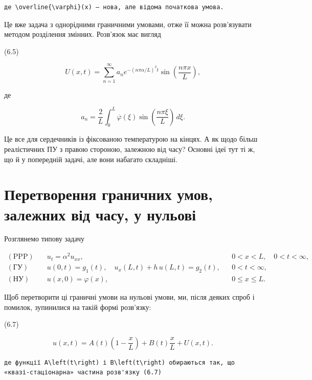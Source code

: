 \documentclass[
  ukrainian,
]{article}
\begin{document}
\begin{verbatim}
де \overline{\varphi}(x) — нова, але відома початкова умова.
\end{verbatim}

Це вже задача з однорідними граничними умовами, отже її можна
розв'язувати методом розділення змінних. Розв'язок має вигляд

(6.5)

\[
U(x,t)=\sum_{n=1}^{\infty} a_n e^{-(n\pi\alpha/L)^2 t}\sin\!\left(\frac{n\pi x}{L}\right),
\]

де

\[
a_n=\frac{2}{L}\int_0^L \overline{\varphi}(\xi)\sin\!\left(\frac{n\pi \xi}{L}\right)\,d\xi.
\]

Це все для сердечників із фіксованою температурою на кінцях. А як щодо
більш реалістичних ПУ з правою стороною, залежною від часу? Основні ідеї
тут ті ж, що й у попередній задачі, але вони набагато складніші.

\section{Перетворення граничних умов, залежних від часу, у
нульові}\label{ux43fux435ux440ux435ux442ux432ux43eux440ux435ux43dux43dux44f-ux433ux440ux430ux43dux438ux447ux43dux438ux445-ux443ux43cux43eux432-ux437ux430ux43bux435ux436ux43dux438ux445-ux432ux456ux434-ux447ux430ux441ux443-ux443-ux43dux443ux43bux44cux43eux432ux456}

Розглянемо типову задачу

\[
\begin{aligned}
(\text{PPP})\quad & u_t = \alpha^2 u_{xx}, && 0 < x < L,\quad 0 < t < \infty, \\
(\text{ГУ})\quad & u(0,t)=g_1(t),\quad u_x(L,t)+h\,u(L,t)=g_2(t), && 0 < t < \infty, \\
(\text{НУ})\quad & u(x,0)=\varphi(x), && 0 \le x \le L.
\end{aligned}
\]

Щоб перетворити ці граничні умови на нульові умови, ми, після деяких
спроб і помилок, зупинилися на такій формі розв'язку:

(6.7)

\[
u(x, t)=A(t)\left(1-\frac{x}{L}\right)+B(t)\frac{x}{L}+U(x, t).
\]

\begin{verbatim}
де функції A\left(t\right) і B\left(t\right) обираються так, що «квазі-стаціонарна» частина розв'язку (6.7)
\end{verbatim}
\end{document}
